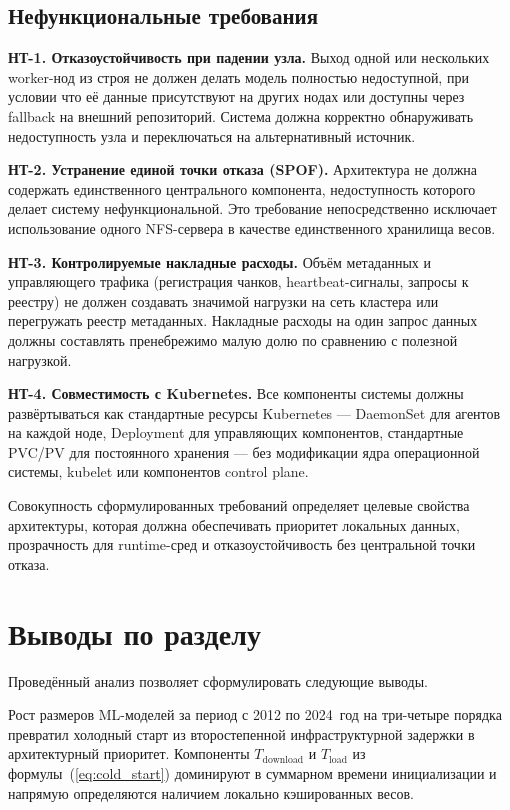 \subsection{Нефункциональные требования}

\textbf{НТ-1. Отказоустойчивость при падении узла.} Выход одной или нескольких worker-нод из строя не должен делать модель полностью недоступной, при условии что её данные присутствуют на других нодах или доступны через fallback на внешний репозиторий. Система должна корректно обнаруживать недоступность узла и переключаться на альтернативный источник.

\textbf{НТ-2. Устранение единой точки отказа (SPOF).} Архитектура не должна содержать единственного центрального компонента, недоступность которого делает систему нефункциональной. Это требование непосредственно исключает использование одного NFS-сервера в качестве единственного хранилища весов.

\textbf{НТ-3. Контролируемые накладные расходы.} Объём метаданных и управляющего трафика (регистрация чанков, heartbeat-сигналы, запросы к реестру) не должен создавать значимой нагрузки на сеть кластера или перегружать реестр метаданных. Накладные расходы на один запрос данных должны составлять пренебрежимо малую долю по сравнению с полезной нагрузкой.

\textbf{НТ-4. Совместимость с Kubernetes.} Все компоненты системы должны развёртываться как стандартные ресурсы Kubernetes --- DaemonSet для агентов на каждой ноде, Deployment для управляющих компонентов, стандартные PVC/PV для постоянного хранения --- без модификации ядра операционной системы, kubelet или компонентов control plane.

Совокупность сформулированных требований определяет целевые свойства архитектуры, которая должна обеспечивать приоритет локальных данных, прозрачность для runtime-сред и отказоустойчивость без центральной точки отказа.

\section{Выводы по разделу}

Проведённый анализ позволяет сформулировать следующие выводы.

Рост размеров ML-моделей за период с 2012 по 2024~год на три-четыре порядка превратил холодный старт из второстепенной инфраструктурной задержки в архитектурный приоритет. Компоненты $T_{\mathrm{download}}$ и $T_{\mathrm{load}}$ из формулы~(\ref{eq:cold_start}) доминируют в суммарном времени инициализации и напрямую определяются наличием локально кэшированных весов.

